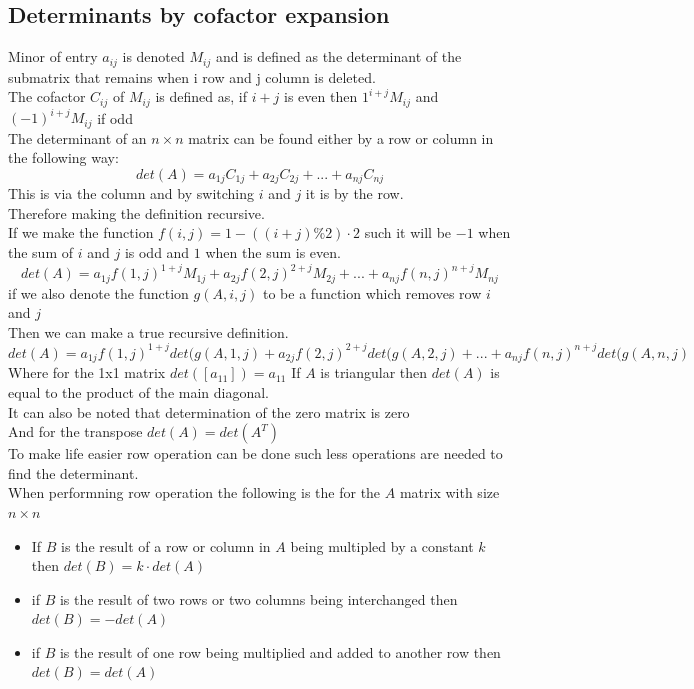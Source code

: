 \documentclass[12pt, a4paper]{article}
\begin{document}
		\subsection{Determinants by cofactor expansion}
			Minor of entry $a_{ij}$ is denoted $M_{ij}$ and is defined as the determinant of the submatrix that remains when i row and j column is deleted.\\
			The cofactor $C_{ij}$ of $M_{ij}$ is defined as, if $i+j$ is even then $1^{i+j}M_{ij}$ and $(-1)^{i+j}M_{ij}$ if odd\\
			The determinant of an $n\times n$ matrix can be found either by a row or column in the following way:
			$$det(A)=a_{1j}C_{1j}+a_{2j}C_{2j}+...+a_{nj}C_{nj}$$
			This is via the column and by switching $i$ and $j$ it is by the row.\\
			Therefore making the definition recursive.\\
			If we make the function $f(i,j)=1 - ((i+j) \% 2 ) \cdot 2$ such it will be $-1$ when the sum of $i$ and $j$ is odd and $1$ when the sum is even.
			$$det(A)=a_{1j}f(1,j)^{1+j}M_{1j}+a_{2j}f(2,j)^{2+j}M_{2j}+...+a_{nj}f(n,j)^{n+j}M_{nj}$$
			if we also denote the function $g(A,i,j)$ to be a function which removes row $i$ and $j$\\
			Then we can make a true recursive definition.\\
			$$det(A)=a_{1j}f(1,j)^{1+j}det(g(A,1,j)+a_{2j}f(2,j)^{2+j}det(g(A,2,j)+...+a_{nj}f(n,j)^{n+j}det(g(A,n,j)$$
			Where for the 1x1 matrix $det([a_{11}])=a_{11}$
			If $A$ is triangular then $det(A)$ is equal to the product of the main diagonal.\\[4mm]
			It can also be noted that determination of the zero matrix is zero\\
			And for the transpose $det(A)=det(A^T)$\\[4mm]
			To make life easier row operation can be done such less operations are needed to find the determinant.\\
			When performning row operation the following is the for the $A$ matrix with size $n\times n$
			\begin{itemize}
				\item If $B$ is the result of a row or column in $A$ being multipled by a constant $k$ then $det(B)=k\cdot det(A)$
				\item if $B$ is the result of two rows or two columns being interchanged then $det(B)=-det(A)$
				\item if $B$ is the result of one row being multiplied and added to another row then $det(B)=det(A)$
			\end{itemize}
\end{document}
